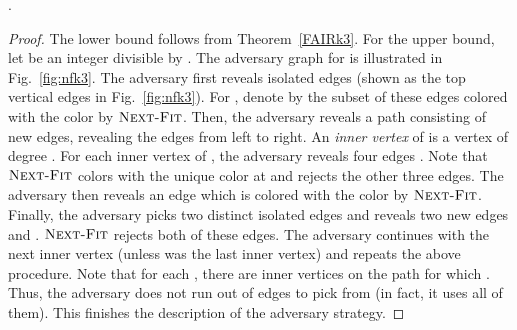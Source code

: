 \documentclass[smallextended]{svjour3}
\newcommand{\NF}{\ensuremath{\operatorname{\textsc{Next-Fit}}}\xspace}
\begin{document}
\begin{theorem}
\label{NFk3}
 .
\end{theorem}
\begin{proof}
The lower bound follows from Theorem~\ref{FAIRk3}.
For the upper bound, let  be an integer divisible by . 
The adversary graph for  is illustrated in Fig.~\ref{fig:nfk3}.
The adversary first reveals  isolated edges (shown as the top vertical edges in Fig.~\ref{fig:nfk3}). 
For , denote by  the subset of these  edges colored with the color  by \NF. Then, the adversary reveals a path  consisting of  new edges, revealing the edges from left to right. An \emph{inner vertex} of  is a vertex of degree . For each inner vertex  of , the adversary reveals four edges . Note that \NF colors  with the unique color  at  and rejects the other three edges. The adversary then reveals an edge  which is colored with the color  by \NF. Finally, the adversary picks two distinct isolated edges  and reveals two new edges  and . \NF rejects both of these edges. The adversary continues with the next inner vertex (unless  was the last inner vertex) and repeats the above procedure. Note that for each , there are  inner vertices on the path for which . Thus, the adversary does not run out of edges to pick from  (in fact, it uses all  of them). This finishes the description of the adversary strategy. 


\end{proof}
\end{document}
